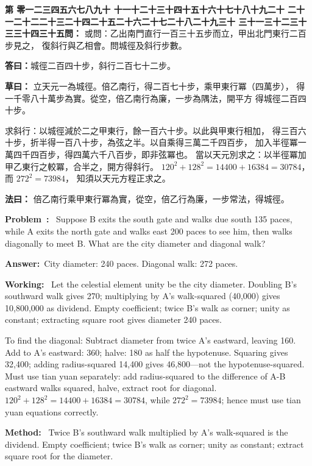\documentclass[9pt,a4paper]{article}
\newcounter{probnum}
\newcounter{overallnum}
\newcommand{\chnum}[1]{%
  \ifcase#1 零\or 一\or 二\or 三\or 四\or 五\or 六\or 七\or 八\or 九\or 十\or
    十一\or 十二\or 十三\or 十四\or 十五\or 十六\or 十七\or 十八\or 十九\or 二十\or
    二十一\or 二十二\or 二十三\or 二十四\or 二十五\or 二十六\or 二十七\or 二十八\or 二十九\or 三十\or
    三十一\or 三十二\or 三十三\or 三十四\or 三十五\fi}
\newcommand{\problem}[1]{\stepcounter{probnum}\stepcounter{overallnum}\par\noindent\textbf{\color{volcolor}第\chnum{\value{probnum}}問：}#1\par\vspace{0.15cm}}
\newcommand{\answer}[1]{\par\noindent\textbf{答曰：}#1\par\vspace{0.15cm}}
\newcommand{\working}[1]{\par\noindent\textbf{草曰：}#1\par\vspace{0.15cm}}
\newcommand{\method}[1]{\par\noindent\textbf{法曰：}#1\par\vspace{0.25cm}}
\newcommand{\eproblem}[1]{\par\noindent\textbf{\color{volcolor}Problem~\theoverallnum:}~#1\par\vspace{0.15cm}}
\newcommand{\eanswer}[1]{\par\noindent\textbf{Answer:}~#1\par\vspace{0.15cm}}
\newcommand{\eworking}[1]{\par\noindent\textbf{Working:}~#1\par\vspace{0.15cm}}
\newcommand{\emethod}[1]{\par\noindent\textbf{Method:}~#1\par\vspace{0.25cm}}
\begin{document}
\noindent\begin{minipage}[t]{0.48\textwidth}
\problem{
或問：乙出南門直行一百三十五步而立，甲出北門東行二百步見之，
復斜行與乙相會。問城徑及斜行步數。
}

\answer{城徑二百四十步，斜行二百七十二步。}

\working{
立天元一為城徑。倍乙南行，得二百七十步，乘甲東行冪（四萬步），
得一千零八十萬步為實。從空，倍乙南行為廉，一步為隅法，開平方
得城徑二百四十步。

求斜行：以城徑減於二之甲東行，餘一百六十步。以此與甲東行相加，
得三百六十步，折半得一百八十步，為弦之半。以自乘得三萬二千四百步，
加入半徑冪一萬四千四百步，得四萬六千八百步，即非弦冪也。
當以天元別求之：以半徑冪加甲乙東行之較冪，合半之，開方得斜行。
$120^2 + 128^2 = 14400 + 16384 = 30784$，而 $272^2 = 73984$，
知須以天元方程正求之。
}

\method{
倍乙南行乘甲東行冪為實，從空，倍乙行為廉，一步常法，得城徑。
}
\end{minipage}%
\hfill%
\begin{minipage}[t]{0.50\textwidth}
\eproblem{
Suppose B exits the south gate and walks due south 135 paces, while A exits
the north gate and walks east 200 paces to see him, then walks diagonally
to meet B. What are the city diameter and diagonal walk?
}

\eanswer{City diameter: 240 paces. Diagonal walk: 272 paces.}

\eworking{
Let the celestial element unity be the city diameter. Doubling B's southward
walk gives 270; multiplying by A's walk-squared (40,000) gives 10,800,000 as
dividend. Empty coefficient; twice B's walk as corner; unity as constant;
extracting square root gives diameter 240 paces.

To find the diagonal: Subtract diameter from twice A's eastward, leaving 160.
Add to A's eastward: 360; halve: 180 as half the hypotenuse. Squaring gives
32,400; adding radius-squared 14,400 gives 46,800---not the hypotenuse-squared.
Must use tian yuan separately: add radius-squared to the difference of A-B
eastward walks squared, halve, extract root for diagonal.
$120^2 + 128^2 = 14400 + 16384 = 30784$, while $272^2 = 73984$;
hence must use tian yuan equations correctly.
}

\emethod{
Twice B's southward walk multiplied by A's walk-squared is the dividend.
Empty coefficient; twice B's walk as corner; unity as constant;
extract square root for the diameter.
}
\end{minipage}
\vspace{0.15cm}
\end{document}
